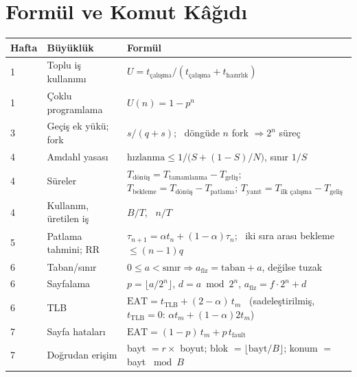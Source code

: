 \section{Formül ve Komut Kâğıdı}
\label{sec:sheet}

\begin{center}
\small
\renewcommand{\arraystretch}{1.25}
\begin{tabularx}{\linewidth}{@{}l>{\raggedright\arraybackslash}p{3.1cm}>{\raggedright\arraybackslash}X@{}}
\toprule
\textbf{Hafta} & \textbf{Büyüklük} & \textbf{Formül} \\
\midrule
1 & Toplu iş kullanımı & $U = t_{\text{çalışma}}/(t_{\text{çalışma}} + t_{\text{hazırlık}})$ \\
1 & Çoklu programlama & $U(n) = 1 - p^{n}$ \\
3 & Geçiş ek yükü; fork & $s/(q+s)$; \ döngüde $n$ fork $\Rightarrow 2^{n}$ süreç \\
4 & Amdahl yasası & $\text{hızlanma} \le 1/\bigl(S + (1-S)/N\bigr)$, sınır $1/S$ \\
4 & Süreler & $T_{\text{dönüş}} = T_{\text{tamamlanma}} - T_{\text{geliş}}$; $T_{\text{bekleme}} = T_{\text{dönüş}} - T_{\text{patlama}}$; $T_{\text{yanıt}} = T_{\text{ilk çalışma}} - T_{\text{geliş}}$ \\
4 & Kullanım, üretilen iş & $B/T$, \ $n/T$ \\
5 & Patlama tahmini; RR & $\tau_{n+1} = \alpha t_n + (1-\alpha)\tau_n$; \ iki sıra arası bekleme $\le (n-1)q$ \\
6 & Taban/sınır & $0 \le a < \text{sınır} \Rightarrow a_{\text{fiz}} = \text{taban} + a$, değilse tuzak \\
6 & Sayfalama & $p = \lfloor a/2^{n}\rfloor$, $d = a \bmod 2^{n}$, $a_{\text{fiz}} = f\cdot 2^{n} + d$ \\
6 & TLB & $\text{EAT} = t_{\text{TLB}} + (2-\alpha)\,t_m$ \ (sadeleştirilmiş, $t_{\text{TLB}} = 0$: $\alpha t_m + (1-\alpha) 2t_m$) \\
7 & Sayfa hataları & $\text{EAT} = (1-p)\,t_m + p\,t_{\text{fault}}$ \\
7 & Doğrudan erişim & bayt $= r \times$ boyut; blok $= \lfloor \text{bayt}/B \rfloor$; konum $=$ bayt $\bmod B$ \\
\bottomrule
\end{tabularx}


\end{center}
